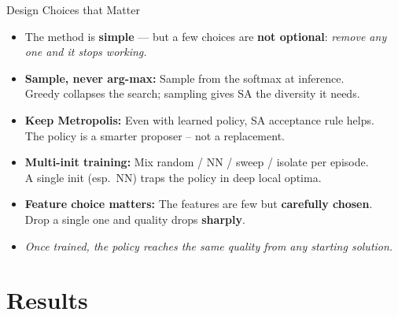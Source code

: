 \documentclass{beamer}
\newcommand{\highlight}[1]{\textcolor{myorange}{\textbf{#1}}}
\newcommand{\bad}[1]{\textcolor{myred}{\textbf{#1}}}
\begin{document}
\begin{frame}{Design Choices that Matter}
\small

\begin{itemize}
\item[] The method is \highlight{simple} --- but a few choices are \bad{not optional}: \emph{remove any one and it stops working.}
\end{itemize}

\begin{block}{}
\begin{itemize}
\item \small{\bf Sample, never arg-max:} 
Sample from the softmax at inference. \\ \smallskip
\footnotesize{Greedy collapses the search; sampling gives SA the diversity it needs.} \smallskip
\item \small{\bf Keep Metropolis:} 
Even with learned policy, SA acceptance rule helps. \\ \smallskip
\footnotesize{The policy is a smarter proposer -- not a replacement.}
\smallskip
\item \small{\bf Multi-init training:} 
Mix random / NN / sweep / isolate per episode. \\ \smallskip
\footnotesize{A single init (esp.\ NN) traps the policy in deep local optima.}
\smallskip
\item \small{\bf Feature choice matters:} 
The features are few but \highlight{carefully chosen}. \\ \smallskip
\footnotesize{Drop a single one and quality drops \bad{sharply}.}
\end{itemize}
\end{block}

\begin{itemize}
\item[] \emph{Once trained, the policy reaches the same quality from any starting solution.}
\end{itemize}

\end{frame}

\section{Results}
\end{document}
